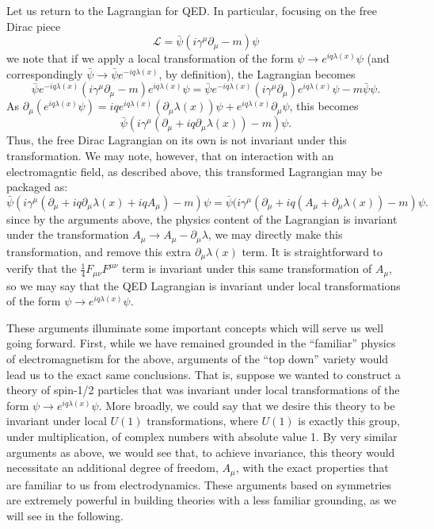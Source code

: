 Let us return to the Lagrangian for QED. In particular, focusing on the free Dirac piece
\begin{equation}
\mathcal{L} = \bar{\psi}(i\gamma^{\mu}\partial_{\mu} - m)\psi 
\end{equation}
we note that if we apply a local transformation of the form $\psi\rightarrow e^{iq\lambda(x)}\psi$
(and correspondingly $\bar{\psi}\rightarrow \bar{\psi}e^{-iq\lambda(x)}$, by definition), the Lagrangian 
becomes
\begin{equation}
\bar{\psi}e^{-iq\lambda(x)}(i\gamma^{\mu}\partial_{\mu} - m)e^{iq\lambda(x)}\psi = 
\bar{\psi}e^{-iq\lambda(x)}(i\gamma^{\mu}\partial_{\mu})e^{iq\lambda(x)}\psi - m\bar{\psi}\psi.
\end{equation}
As $\partial_{\mu} (e^{iq\lambda(x)}\psi) = iqe^{iq\lambda(x)}(\partial_{\mu}\lambda(x))\psi + e^{iq\lambda(x)}\partial_{\mu}\psi$, this becomes
\begin{equation}
\bar{\psi}(i\gamma^{\mu}(\partial_{\mu}+iq\partial_{\mu}\lambda(x)) - m)\psi.
\end{equation}
Thus, the free Dirac Lagrangian on its own is not invariant under this transformation. We may note, however,
that on interaction with an electromagntic field, as described above, this transformed Lagrangian
may be packaged as:
\begin{equation}
\bar{\psi}(i\gamma^{\mu}(\partial_{\mu}+ iq\partial_{\mu}\lambda(x)+iq A_{\mu}) - m)\psi =
\bar{\psi}(i\gamma^{\mu}(\partial_{\mu}+ iq(A_{\mu}+\partial_{\mu}\lambda(x)) - m)\psi.
\end{equation}
since by the arguments above, the physics content of the Lagrangian is invariant under the transformation 
$A_{\mu} \rightarrow A_{\mu} - \partial_{\mu}\lambda$,  we may directly make this transformation, and remove 
this extra $\partial_{\mu}\lambda(x)$ term. It is straightforward to verify that the $\frac{1}{4} F_{\mu\nu}F^{\mu\nu}$
term is invariant under this same transformation of $A_{\mu}$, so we may say that the QED Lagrangian is 
invariant under local transformations of the form $\psi\rightarrow e^{iq\lambda(x)}\psi$.

These arguments illuminate some important concepts which will serve us well going forward. First, while we have 
remained grounded in the ``familiar'' physics of electromagnetism for the above, arguments of the ``top down''
variety would lead us to the exact same conclusions. That is, suppose we wanted to construct a theory of 
spin-1/2 particles that was invariant under local transformations of the form $\psi\rightarrow e^{iq\lambda(x)}\psi$. 
More broadly, we could say that we desire this theory to be invariant under local $U(1)$ transformations, where 
$U(1)$ is exactly this group, under multiplication, of complex numbers with absolute value 1. By very similar 
arguments as above, we would see that, to achieve invariance, this theory would necessitate an additional degree 
of freedom, $A_{\mu}$, with the exact properties that are familiar to us from electrodynamics. These arguments 
based on symmetries are extremely powerful in building theories with a less familiar grounding, as we will 
see in the following.

